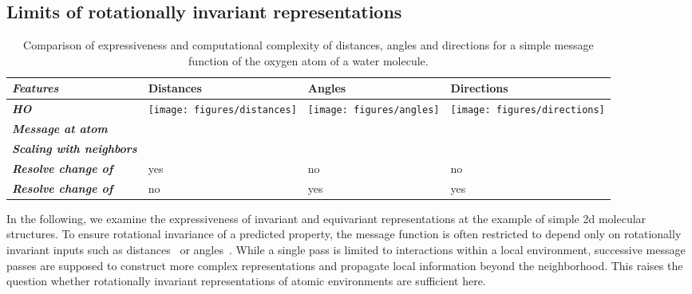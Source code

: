 \documentclass[reprint,
amsmath,amssymb,
 aip,jcp
]{revtex4-2}
\begin{document}
\subsection{Limits of rotationally invariant representations}
\begin{table}[tb]
\caption{Comparison of expressiveness and computational complexity of distances, angles and directions for a simple message function of the oxygen atom of a water molecule.}
\label{tab:equivariant}
\begin{center}
\begin{scriptsize}
\begin{tabularx}{\columnwidth}{>{\centering\arraybackslash}m{2cm}|>{\centering\arraybackslash}m{2.1cm}>{\centering\arraybackslash}m{2.1cm}>{\centering\arraybackslash}m{2.1cm}}
\toprule
\textbf{\textit{Features}} & \textbf{Distances} & \textbf{Angles} & \textbf{Directions} \\ \midrule
 \textit{\textbf{HO}} \vspace{0.5cm} & \texttt{[image: figures/distances]} & \texttt{[image: figures/angles]} & \texttt{[image: figures/directions]}  \\
 \textit{\textbf{Message  at atom }} \vspace{0.3cm} &   &    &    \\
\textit{\textbf{Scaling with neighbors}} &  \vspace{0.1cm} &   \vspace{0.1cm} &   \vspace{0.1cm} \\
\vspace{0.2cm} \textit{\textbf{Resolve change of }} & yes \vspace{0.1cm} & no \vspace{0.1cm} &  no \vspace{0.1cm} \\
\vspace{0.2cm} \textit{\textbf{Resolve change of }} &   no \vspace{0.08cm}& yes \vspace{0.08cm}&  yes \vspace{0.08cm}\\
\bottomrule
\end{tabularx}
\end{scriptsize}
\end{center}
\end{table}
In the following, we examine the expressiveness of invariant and equivariant representations at the example of simple 2d molecular structures.
To ensure rotational invariance of a predicted property, the message function is often restricted to depend only on rotationally invariant inputs such as distances~\cite{schutt2017deep,lubbers2018hierarchical} or angles~\cite{klicpera2020directional,klicpera2020fast}.
While a single pass is limited to interactions within a local environment, successive message passes are supposed to construct more complex representations and propagate local information beyond the neighborhood.
This raises the question whether rotationally invariant representations of atomic environments  are sufficient here.
\end{document}
